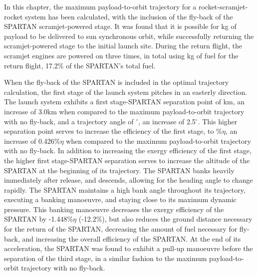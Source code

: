 In this chapter, the maximum payload-to-orbit trajectory for a rocket-scramjet-rocket system has been calculated, with the inclusion of the fly-back of the SPARTAN scramjet-powered stage. It was found that it is possible for \PayloadToOrbitStandard kg of payload to be delivered to sun synchronous orbit, while successfully returning the scramjet-powered stage to the initial launch site. 
During the return flight, the scramjet engines are powered on three times, in total using \returnFuelStandard kg of fuel for the return flight, 17.2\% of the SPARTAN's total fuel.

When the fly-back of the SPARTAN is included in the optimal trajectory calculation, the first stage of the launch system pitches in an easterly direction. 
The launch system exhibits a first stage-SPARTAN separation point of \firstsecondSeparationAltStandard km, an increase of 3.0km when compared to the maximum payload-to-orbit trajectory with no fly-back, and a trajectory angle of \firstsecondSeparationgammaStandard $^\circ$, an increase of 2.5$^\circ$. 
This higher separation point serves to increase the efficiency of the first stage, to \firstExergyEffStandard \%$\eta$, an increase of 0.426\%$\eta$ when compared to the maximum payload-to-orbit trajectory with no fly-back.
In addition to increasing the exergy efficiency of the first stage, the higher first stage-SPARTAN separation serves to increase the altitude of the SPARTAN at the beginning of its trajectory. The SPARTAN banks heavily immediately after release, and descends, allowing for the heading angle to change rapidly. The SPARTAN maintains a high bank angle throughout its trajectory, executing a banking manoeuvre, and staying close to its maximum dynamic pressure. 
This banking manoeuvre decreases the exergy efficiency of the SPARTAN by -1.448\%$\eta$ (-12.2\%), but also reduces the ground distance necessary for the return of the SPARTAN, decreasing the amount of fuel necessary for fly-back, and increasing the overall efficiency of the SPARTAN. 
At the end of its acceleration, the SPARTAN was found to exhibit a pull-up manoeuvre before the separation of the third stage, in a similar fashion to the maximum payload-to-orbit trajectory with no fly-back. 

